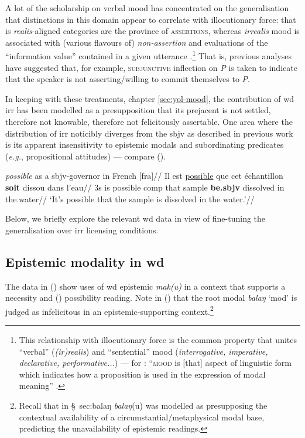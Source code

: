 A lot of the scholarship on verbal mood has concentrated on the generalisation that distinctions in this domain appear to correlate with illocutionary force: that is \textit{realis}-aligned categories are the province of \textsc{assertions}, whereas \textit{irrealis} mood is associated with (various flavours of) \textit{non-assertion} \citep[\textit{e.g.},][]{Bybee1995, Palmer2001} and evaluations of the ``information value'' contained in a given utterance \citep[\textit{e.g.},][]{Lunn1995}.\footnote{This relationship with illocutionary force is the common property that unites ``verbal'' (\textit{(ir)realis}) and ``sentential'' mood (\textit{interrogative, imperative, declarative, performative...}) --- for \citeauthor{Portner2018a}: ``\textsc{mood} is [that] aspect of linguistic form which indicates how a proposition is used in the expression of modal meaning'' \citeyearpar[4]{Portner2018a}.} That is, previous analyses have suggested that, for example, \textsc{subjunctive} inflection on \textit{P} is taken to indicate that the speaker is not asserting/willing to commit themselves to \textit{P}. 

In keeping with these treatments, chapter \ref{sec:yol-mood}, the contribution of \acrshort{wd} \gls{irr} has been modelled as a presupposition that its prejacent is not settled, therefore not knowable, therefore not felicitously assertable. One area where the distribution of \gls{irr} noticibly diverges from the \gls{sbjv} as described in previous work is its apparent insensitivity to epistemic modals and subordinating predicates (\textit{e.g.}, propositional attitudes) --- compare (\nextx).

\pex 
\begingl\glpreamble \textit{possible} as a \gls{sbjv}-governor in French [\gls{fra}]//
\gla Il est \ul{possible} que cet échantillon \textbf{soit} dissou dans l'eau//
\glb 3s is possible \gls{comp} that sample \textbf{be.\gls{sbjv}} dissolved in the.water//
\glft`It's possible that the sample is dissolved in the water.'//\endgl\xe


Below, we briefly explore the relevant \acrshort{wd} data in view of fine-tuning the generalisation over \gls{irr} licensing conditions. 


	\subsection{Epistemic modality in \gls{wd}}
	
	
	The data in (\nextx) show uses of \gls{wd} epistemic \textit{mak(u)} in a context that supports a  necessity and  () possibility reading. Note in () that the root modal \textit{balaŋ} `\gls{mod}' is judged as infelicitous in an epistemic-supporting context.\footnote{Recall that in \S~{sec:balaŋ} \textit{balaŋ}(u) was modelled as presupposing the contextual availability of a circumstantial/metaphysical modal base, predicting the unavailability of epistemic readings.}
	
